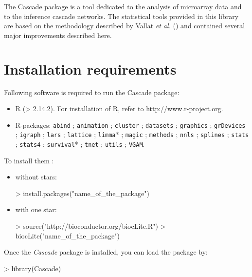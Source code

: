 \documentclass[a4paper]{article}
\begin{document}
The Cascade package is a tool dedicated to the analysis of microarray data and to the inference cascade networks. 
The statistical tools provided in this library  are based on the methodology described by Vallat \textit{et al.} (\cite{vallat2013reverse}) and contained several major improvements described here.

\clearpage

\section{Installation requirements}

Following software is required to run the Cascade package:

\begin{itemize}
\item R (> 2.14.2). For installation of R, refer to http://www.r-project.org.
\item R-packages: \texttt{abind} ; \texttt{animation} ; \texttt{cluster} ; \texttt{datasets} ; \texttt{graphics} ; \texttt{grDevices} ; \texttt{igraph} ; \texttt{lars} ; \texttt{lattice} ; \texttt{limma}* ; \texttt{magic} ; \texttt{methods} ; \texttt{nnls} ; \texttt{splines} ; \texttt{stats} ; \texttt{stats4} ; \texttt{survival}* ; \texttt{tnet} ; \texttt{utils} ; \texttt{VGAM}. 
\end{itemize}

\noindent
To install them :

\begin{itemize}
\item without stars: 
\begin{Schunk}
\begin{Sinput}
> install.packages("name_of_the_package")
\end{Sinput}
\end{Schunk}
\item with one star:
\begin{Schunk}
\begin{Sinput}
> source("http://bioconductor.org/biocLite.R")
> biocLite("name_of_the_package")
\end{Sinput}
\end{Schunk}
\end{itemize}

\noindent
Once the \textit{Cascade} package is installed, you can load the package by: 

\begin{Schunk}
\begin{Sinput}
> library(Cascade)
\end{Sinput}
\end{Schunk}
\end{document}
